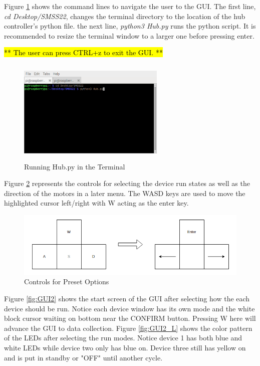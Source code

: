 \documentclass[journal]{IEEEtran}
\begin{document}
            Figure \ref{fig:Term_hub} shows the command lines to navigate the user to the GUI. The first line, \emph{cd Desktop/SMSS22}, changes the terminal directory to the location of the hub controller's python file. the next line, \emph{python3 Hub.py} runs the python script. It is recommended to resize the terminal window to a larger one before pressing enter. 
            
            \hl{** The user can press CTRL+z to exit the GUI. **}
            
            \begin{figure}[H]
                \centering
                \includegraphics[width=7cm, height=5cm]{Images/terminal_hub2.png}
                \caption{Running Hub.py in the Terminal}
                \label{fig:Term_hub}
            \end{figure}
            
            Figure \ref{fig:keys_states} represents the controls for selecting the device run states as well as the direction of the motors in a later menu. The WASD keys are used to move the highlighted cursor left/right with W acting as the enter key.
            
            \begin{figure}[H]
                \centering
                \includegraphics[scale = 0.35]{Images/KeySel_state.png}
                \caption{Controls for Preset Options}
                \label{fig:keys_states}
            \end{figure}
            
            Figure \ref{fig:GUI2} shows the start screen of the GUI after selecting how the each device should be run. Notice each device window has its own mode and the white block cursor waiting on bottom near the CONFIRM button. Pressing W here will advance the GUI to data collection. Figure \ref{fig:GUI2_L} shows the color pattern of the LEDs after selecting the run modes. Notice device 1 has both blue and white LEDs while device two only has blue on. Device three still has yellow on and is put in standby or "OFF" until another cycle.
            
\end{document}
